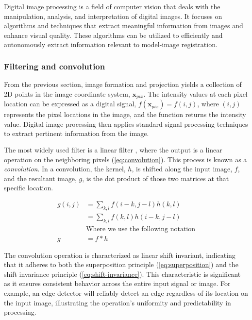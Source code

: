 Digital image processing is a field of computer vision that deals with the manipulation, analysis, and interpretation of digital images.
It focuses on algorithms and techniques that extract meaningful information from images and enhance visual quality.
These algorithms can be utilized to efficiently and autonomously extract information relevant to model-image registration.

\subsubsection{Filtering and convolution}
\label{sec:filtering-convolution}
From the previous section, image formation and projection yields a collection of 2D points in the image coordinate system, $\mathbf{x}_{pix}$.
The intensity values at each pixel location can be expressed as a digital signal, $f(\mathbf{x}_{pix}) = f(i,j)$, where $(i,j)$ represents the pixel locations in the image, and the function returns the intensity value.
Digital image processing then applies standard signal processing techniques to extract pertinent information from the image.

The most widely used filter is a linear filter \cite{szeliskiComputerVisionAlgorithms2022}, where the output is a linear operation on the neighboring pixels (\cref{eq:convolution}).
This process is known as a \emph{convolution}.
In a convolution, the kernel, $h$, is shifted along the input image, $f$, and the resultant image, $g$, is the dot product of those two matrices at that specific location.

\begin{equation}
    \begin{aligned}
        g(i,j) &= \sum_{k,l}f(i-k,j-l)h(k,l) \\
        &= \sum_{k,l}f(k,l)h(i-k,j-l) \\
        &\text{Where we use the following notation}\\
        g&= f * h
    \end{aligned}
    \label{eq:convolution}
\end{equation}

The convolution operation is characterized as linear shift invariant, indicating that it adheres to both the superposition principle (\cref{eq:superposition}) and the shift invariance principle (\cref{eq:shift-invariance}).
This characteristic is significant as it ensures consistent behavior across the entire input signal or image.
For example, an edge detector will reliably detect an edge regardless of its location on the input image, illustrating the operation's uniformity and predictability in processing.

